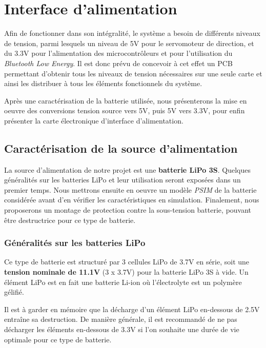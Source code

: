 \chapter{Interface d'alimentation}
		
	Afin de fonctionner dans son intégralité, le système a besoin de différents niveaux de tension, parmi lesquels un niveau de 5V pour le servomoteur de direction, et du 3.3V pour l'alimentation des microcontrôleurs et pour l'utilisation du \textit{Bluetooth Low Energy}. Il est donc prévu de concevoir à cet effet un PCB permettant d'obtenir tous les niveaux de tension nécessaires sur une seule carte et ainsi les distribuer à tous les éléments fonctionnels du système. 
	
	Après une caractérisation de la batterie utilisée, nous présenterons la mise en oeuvre des conversions tension source vers 5V, puis 5V vers 3.3V, pour enfin présenter la carte électronique d'interface d'alimentation.
		
		\section{Caractérisation de la source d'alimentation}
			
		La source d'alimentation de notre projet est une \textbf{batterie LiPo 3S}. Quelques généralités sur les batteries LiPo et leur utilisation seront exposées dans un premier temps. Nous mettrons ensuite en oeuvre un modèle \textit{PSIM} de la batterie considérée avant d'en vérifier les caractéristiques en simulation. Finalement, nous proposerons un montage de protection contre la sous-tension batterie, pouvant être destructrice pour ce type de batterie.
		
			\subsection{Généralités sur les batteries LiPo}
			
			Ce type de batterie est structuré par 3 cellules LiPo de 3.7V en série, soit une \textbf{tension nominale de 11.1V} (3 x 3.7V) pour la batterie LiPo 3S à vide. Un élément LiPo est en fait une batterie Li-ion où l'électrolyte est un polymère gélifié.
			
		Il est à garder en mémoire que la décharge d'un élément LiPo en-dessous de 2.5V entraîne sa destruction. De manière générale, il est recommandé de ne pas décharger les éléments en-dessous de 3.3V si l'on souhaite une durée de vie optimale pour ce type de batterie. 
			
